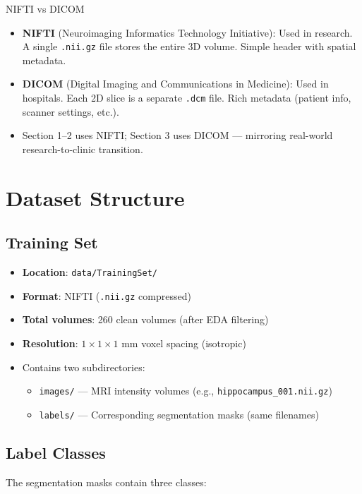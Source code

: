 \documentclass[12pt,a4paper]{report}
\begin{document}
\begin{conceptbox}{NIFTI vs DICOM}
\begin{itemize}
    \item \textbf{NIFTI} (Neuroimaging Informatics Technology Initiative): Used in research. A single \texttt{.nii.gz} file stores the entire 3D volume. Simple header with spatial metadata.
    \item \textbf{DICOM} (Digital Imaging and Communications in Medicine): Used in hospitals. Each 2D slice is a separate \texttt{.dcm} file. Rich metadata (patient info, scanner settings, etc.).
    \item Section 1--2 uses NIFTI; Section 3 uses DICOM --- mirroring real-world research-to-clinic transition.
\end{itemize}
\end{conceptbox}

\section{Dataset Structure}

\subsection{Training Set}
\begin{itemize}
    \item \textbf{Location}: \texttt{data/TrainingSet/}
    \item \textbf{Format}: NIFTI (\texttt{.nii.gz} compressed)
    \item \textbf{Total volumes}: 260 clean volumes (after EDA filtering)
    \item \textbf{Resolution}: $1 \times 1 \times 1$ mm voxel spacing (isotropic)
    \item Contains two subdirectories:
    \begin{itemize}
        \item \texttt{images/} --- MRI intensity volumes (e.g., \texttt{hippocampus\_001.nii.gz})
        \item \texttt{labels/} --- Corresponding segmentation masks (same filenames)
    \end{itemize}
\end{itemize}

\subsection{Label Classes}
The segmentation masks contain three classes:
\end{document}
